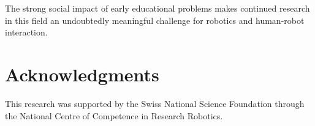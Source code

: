 \documentclass{sig-alternate}
\begin{document}

The strong social impact of early educational problems makes continued research
in this field an undoubtedly meaningful challenge for robotics and human-robot
interaction.

\section*{Acknowledgments}

This research was supported by the Swiss National Science Foundation through the
National Centre of Competence in Research Robotics.





\end{document}
